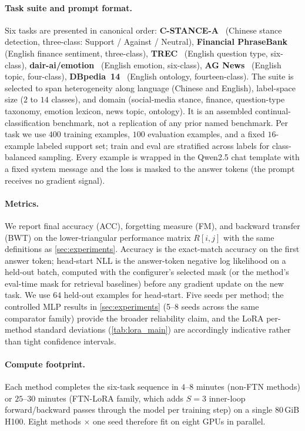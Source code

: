 \documentclass[11pt]{article}
\begin{document}
\paragraph{Task suite and prompt format.}
Six tasks are presented in canonical order: \textbf{C-STANCE-A}~\citep{zhao2024cstance} (Chinese stance detection, three-class: Support / Against / Neutral), \textbf{Financial PhraseBank}~\citep{malo2014finphrasebank} (English finance sentiment, three-class), \textbf{TREC}~\citep{li2002trec} (English question type, six-class), \textbf{dair-ai/emotion}~\citep{saravia2018emotion} (English emotion, six-class), \textbf{AG News}~\citep{zhang2015charcnn} (English topic, four-class), \textbf{DBpedia~14}~\citep{zhang2015charcnn} (English ontology, fourteen-class). The suite is selected to span heterogeneity along language (Chinese and English), label-space size ($2$ to $14$ classes), and domain (social-media stance, finance, question-type taxonomy, emotion lexicon, news topic, ontology). It is an assembled continual-classification benchmark, not a replication of any prior named benchmark. Per task we use $400$ training examples, $100$ evaluation examples, and a fixed $16$-example labeled support set; train and eval are stratified across labels for class-balanced sampling. Every example is wrapped in the Qwen2.5 chat template with a fixed system message and the loss is masked to the answer tokens (the prompt receives no gradient signal).

\paragraph{Metrics.}
We report final accuracy (ACC), forgetting measure (FM), and backward transfer (BWT) on the lower-triangular performance matrix $R[i,j]$ with the same definitions as \cref{sec:experiments}. Accuracy is the exact-match accuracy on the first answer token; head-start NLL is the answer-token negative log likelihood on a held-out batch, computed with the configurer's selected mask (or the method's eval-time mask for retrieval baselines) before any gradient update on the new task. We use $64$ held-out examples for head-start. Five seeds per method; the controlled MLP results in \cref{sec:experiments} (5--8 seeds across the same comparator family) provide the broader reliability claim, and the LoRA per-method standard deviations (\cref{tab:lora_main}) are accordingly indicative rather than tight confidence intervals.

\paragraph{Compute footprint.}
Each method completes the six-task sequence in $4$--$8$ minutes (non-FTN methods) or $25$--$30$ minutes (FTN-LoRA family, which adds $S=3$ inner-loop forward/backward passes through the model per training step) on a single 80\,GiB H100. Eight methods $\times$ one seed therefore fit on eight GPUs in parallel.
\end{document}

